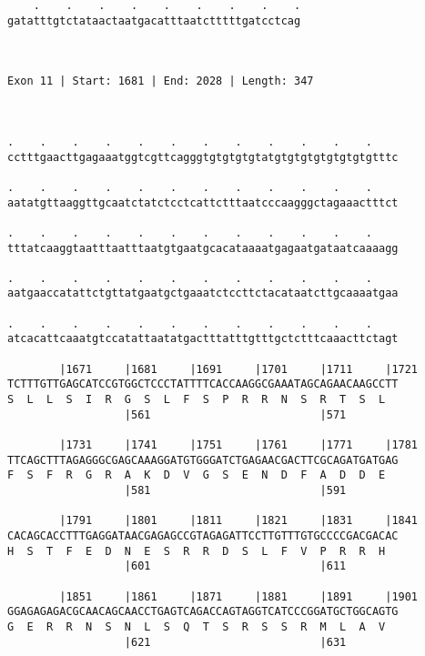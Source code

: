 \documentclass{article}
\begin{document}
\begin{Verbatim}
    .    .    .    .    .    .    .    .    .
gatatttgtctataactaatgacatttaatctttttgatcctcag
                                             
                                             
 
Exon 11 | Start: 1681 | End: 2028 | Length: 347



.    .    .    .    .    .    .    .    .    .    .    .    
cctttgaacttgagaaatggtcgttcagggtgtgtgtgtatgtgtgtgtgtgtgtgtttc
                                                            
.    .    .    .    .    .    .    .    .    .    .    .    
aatatgttaaggttgcaatctatctcctcattctttaatcccaagggctagaaactttct
                                                            
.    .    .    .    .    .    .    .    .    .    .    .    
tttatcaaggtaatttaatttaatgtgaatgcacataaaatgagaatgataatcaaaagg
                                                            
.    .    .    .    .    .    .    .    .    .    .    .    
aatgaaccatattctgttatgaatgctgaaatctccttctacataatcttgcaaaatgaa
                                                            
.    .    .    .    .    .    .    .    .    .    .    .    
atcacattcaaatgtccatattaatatgactttatttgtttgctctttcaaacttctagt
                                                            
        |1671     |1681     |1691     |1701     |1711     |1721
TCTTTGTTGAGCATCCGTGGCTCCCTATTTTCACCAAGGCGAAATAGCAGAACAAGCCTT
S  L  L  S  I  R  G  S  L  F  S  P  R  R  N  S  R  T  S  L  
                  |561                          |571        
  
        |1731     |1741     |1751     |1761     |1771     |1781
TTCAGCTTTAGAGGGCGAGCAAAGGATGTGGGATCTGAGAACGACTTCGCAGATGATGAG
F  S  F  R  G  R  A  K  D  V  G  S  E  N  D  F  A  D  D  E  
                  |581                          |591        
  
        |1791     |1801     |1811     |1821     |1831     |1841
CACAGCACCTTTGAGGATAACGAGAGCCGTAGAGATTCCTTGTTTGTGCCCCGACGACAC
H  S  T  F  E  D  N  E  S  R  R  D  S  L  F  V  P  R  R  H  
                  |601                          |611        
  
        |1851     |1861     |1871     |1881     |1891     |1901
GGAGAGAGACGCAACAGCAACCTGAGTCAGACCAGTAGGTCATCCCGGATGCTGGCAGTG
G  E  R  R  N  S  N  L  S  Q  T  S  R  S  S  R  M  L  A  V  
                  |621                          |631        
  

\end{Verbatim}
\end{document}
